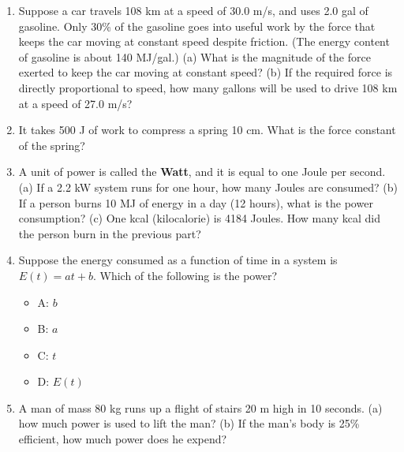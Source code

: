 \documentclass{article}
\begin{document}
\begin{enumerate}
\item Suppose a car travels 108 km at a speed of 30.0 m/s, and uses 2.0 gal of gasoline. Only 30\% of the gasoline goes into useful work by the force that keeps the car moving at constant speed despite friction. (The energy content of gasoline is about 140 MJ/gal.) (a) What is the magnitude of the force exerted to keep the car moving at constant speed? (b) If the required force is directly proportional to speed, how many gallons will be used to drive 108 km at a speed of 27.0 m/s? \\ \vspace{4cm}
\item It takes 500 J of work to compress a spring 10 cm. What is the force constant of the spring? \\ \vspace{3cm}
\item A unit of power is called the \textbf{Watt}, and it is equal to one Joule per second.  (a) If a 2.2 kW system runs for one hour, how many Joules are consumed? (b) If a person burns 10 MJ of energy in a day (12 hours), what is the power consumption? (c) One kcal (kilocalorie) is 4184 Joules.  How many kcal did the person burn in the previous part? \\ \vspace{2cm}
\item Suppose the energy consumed as a function of time in a system is $E(t) = a t + b$.  Which of the following is the power?
\begin{itemize}
\item A: $b$
\item B: $a$
\item C: $t$
\item D: $E(t)$
\end{itemize}
\item A man of mass 80 kg runs up a flight of stairs 20 m high in 10 seconds. (a) how much power is used to lift the man? (b) If the man’s body is 25\% efficient, how much power does he expend?
\end{enumerate}
\end{document}
